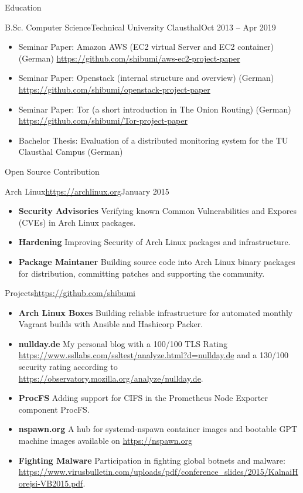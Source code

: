 \documentclass[]{mcdowellcv}
\begin{document}
\begin{cvsection}{Education}
\begin{cvsubsection}{B.Sc. Computer Science}{Technical University Clausthal}{Oct 2013 -- Apr 2019}
\begin{itemize}
\item Seminar Paper: Amazon AWS (EC2 virtual Server and EC2 container) (German) \url{https://github.com/shibumi/aws-ec2-project-paper}
\item Seminar Paper: Openstack (internal structure and overview) (German) \url{https://github.com/shibumi/openstack-project-paper}
\item Seminar Paper: Tor (a short introduction in The Onion Routing) (German) \url{https://github.com/shibumi/Tor-project-paper}
\item Bachelor Thesis: Evaluation of a distributed monitoring system for the TU Clausthal Campus (German)
\end{itemize}
\end{cvsubsection}

\end{cvsection}
\newpage
\begin{cvsection}{Open Source Contribution}
\begin{cvsubsection}{Arch Linux}{\url{https://archlinux.org}}{January 2015}
\begin{itemize}
\item \textbf{Security Advisories} Verifying known Common Vulnerabilities and Expores (CVEs) in Arch Linux packages.
\item \textbf{Hardening} Improving Security of Arch Linux packages and infrastructure.
\item \textbf{Package Maintaner} Building source code into Arch Linux binary packages for distribution, committing patches and supporting the community.
\end{itemize}
\end{cvsubsection}

\begin{cvsubsection}{Projects}{\url{https://github.com/shibumi}}{}
\begin{itemize}
\item \textbf{Arch Linux Boxes} Building reliable infrastructure for automated monthly Vagrant builds with Ansible and Hashicorp Packer.
\item \textbf{nullday.de} My personal blog with a 100/100 TLS Rating \url{https://www.ssllabs.com/ssltest/analyze.html?d=nullday.de} and a 130/100 security rating according to \url{https://observatory.mozilla.org/analyze/nullday.de}.
\item \textbf{ProcFS} Adding support for CIFS in the Prometheus Node Exporter component ProcFS.
\item \textbf{nspawn.org} A hub for systemd-nspawn container images and bootable GPT machine images available on \url{https://nspawn.org}
\item \textbf{Fighting Malware} Participation in fighting global botnets and malware: \url{https://www.virusbulletin.com/uploads/pdf/conference_slides/2015/KalnaiHorejsi-VB2015.pdf}.
\end{itemize}
\end{cvsubsection}
\end{cvsection}
\end{document}

